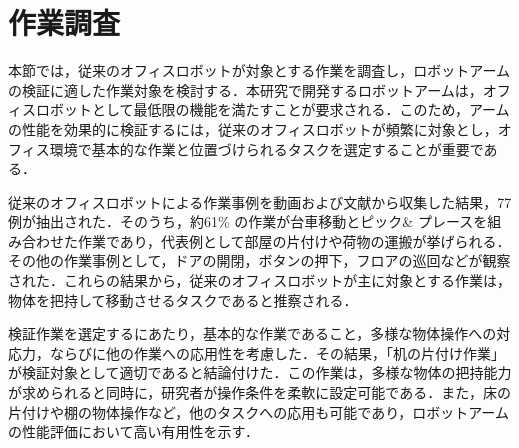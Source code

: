 \section{作業調査}
本節では，従来のオフィスロボットが対象とする作業を調査し，ロボットアームの検証に適した作業対象を検討する．本研究で開発するロボットアームは，オフィスロボットとして最低限の機能を満たすことが要求される．このため，アームの性能を効果的に検証するには，従来のオフィスロボットが頻繁に対象とし，オフィス環境で基本的な作業と位置づけられるタスクを選定することが重要である．

従来のオフィスロボットによる作業事例を動画および文献から収集した結果，77例が抽出された．そのうち，約61\% の作業が台車移動とピック\& プレースを組み合わせた作業であり，代表例として部屋の片付けや荷物の運搬が挙げられる．その他の作業事例として，ドアの開閉，ボタンの押下，フロアの巡回などが観察された．これらの結果から，従来のオフィスロボットが主に対象とする作業は，物体を把持して移動させるタスクであると推察される．

検証作業を選定するにあたり，基本的な作業であること，多様な物体操作への対応力，ならびに他の作業への応用性を考慮した．その結果，「机の片付け作業」が検証対象として適切であると結論付けた．この作業は，多様な物体の把持能力が求められると同時に，研究者が操作条件を柔軟に設定可能である．また，床の片付けや棚の物体操作など，他のタスクへの応用も可能であり，ロボットアームの性能評価において高い有用性を示す．
\newpage